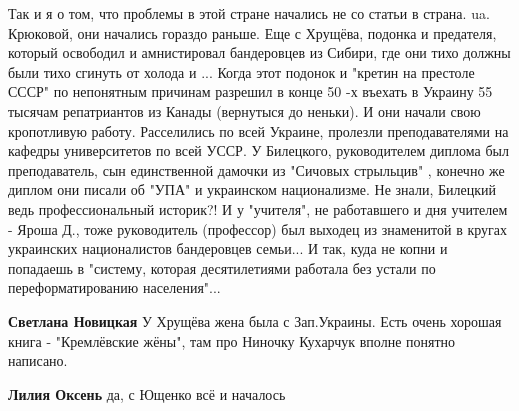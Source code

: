 \begin{itemize}
\begin{itemize}
 

Так и я о том, что проблемы в этой стране начались не со статьи в страна. ua.
Крюковой, они начались гораздо раньше. Еще с Хрущёва, подонка и предателя,
который освободил и амнистировал бандеровцев из Сибири, где они тихо должны
были тихо сгинуть от холода и ... Когда этот подонок и "кретин на престоле
СССР" по непонятным причинам разрешил в конце 50 -х въехать в Украину 55
тысячам репатриантов из Канады (вернутыся до неньки). И они начали свою
кропотливую работу. Расселились по всей Украине, пролезли преподавателями на
кафедры университетов по всей УССР. У Билецкого, руководителем диплома был
преподаватель, сын единственной дамочки из "Сичовых стрыльцив" , конечно же
диплом они писали об "УПА" и украинском национализме. Не знали, Билецкий ведь
профессиональный историк?! И у "учителя", не работавшего и дня учителем - Яроша
Д., тоже руководитель (профессор) был выходец из знаменитой в кругах украинских
националистов бандеровцев семьи... И так, куда не копни и попадаешь в "систему,
которая десятилетиями работала без устали по переформатированию населения"...

 
\textbf{Светлана Новицкая} У Хрущёва жена была с Зап.Украины. Есть очень
хорошая книга - "Кремлёвские жёны", там про Ниночку Кухарчук вполне понятно
написано.

 
\textbf{Лилия Оксень} да, с Ющенко всё и началось

\end{itemize}

 


\end{itemize}
